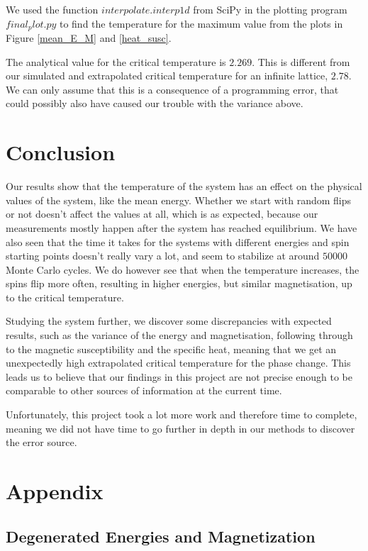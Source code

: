 \documentclass{article}
\begin{document}
{{{	We used the function $interpolate.interp1d$ from SciPy in the plotting program $final_plot.py$ to find the temperature for the maximum value from the plots in Figure \ref{mean_E_M} and \ref{heat_susc}.

	The analytical value for the critical temperature is $2.269$. This is different from our simulated and extrapolated critical temperature for an infinite lattice, $2.78$. We can only assume that this is a consequence of a programming error, that could possibly also have caused our trouble with the variance above.

\section{Conclusion}
	Our results show that the temperature of the system has an effect on the physical values of the system, like the mean energy. Whether we start with random flips or not doesn't affect the values at all, which is as expected, because our measurements mostly happen after the system has reached equilibrium. We have also seen that the time it takes for the systems with different energies and spin starting points doesn't really vary a lot, and seem to stabilize at around $50 000$ Monte Carlo cycles. We do however see that when the temperature increases, the spins flip more often, resulting in higher energies, but similar magnetisation, up to the critical temperature.

	Studying the system further, we discover some discrepancies with expected results, such as the variance of the energy and magnetisation, following through to the magnetic susceptibility and the specific heat, meaning that we get an unexpectedly high extrapolated critical temperature for the phase change. This leads us to believe that our findings in this project are not precise enough to be comparable to other sources of information at the current time.

	Unfortunately, this project took a lot more work and therefore time to complete, meaning we did not have time to go further in depth in our methods to discover the error source.


\section{Appendix}
	\subsection{Degenerated Energies and Magnetization}

}}}
\end{document}
